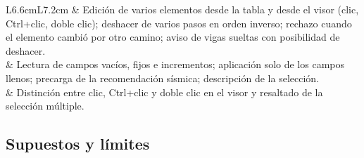 \begin{longtable}{L{6.6cm}L{7.2cm}}
	 & Edición de varios elementos desde la tabla y desde el visor (clic, Ctrl+clic,
	doble clic); deshacer de varios pasos en orden inverso; rechazo cuando el elemento cambió por otro camino; aviso de
	vigas sueltas con posibilidad de deshacer. \\
	 & Lectura de campos vacíos, fijos e incrementos; aplicación solo de los campos
	llenos; precarga de la recomendación sísmica; descripción de la selección. \\
	 & Distinción entre clic, Ctrl+clic y doble clic en el visor y resaltado de la
	selección múltiple. \\
\end{longtable}

\subsection{Supuestos y límites}
\label{sec:mod-limites}

